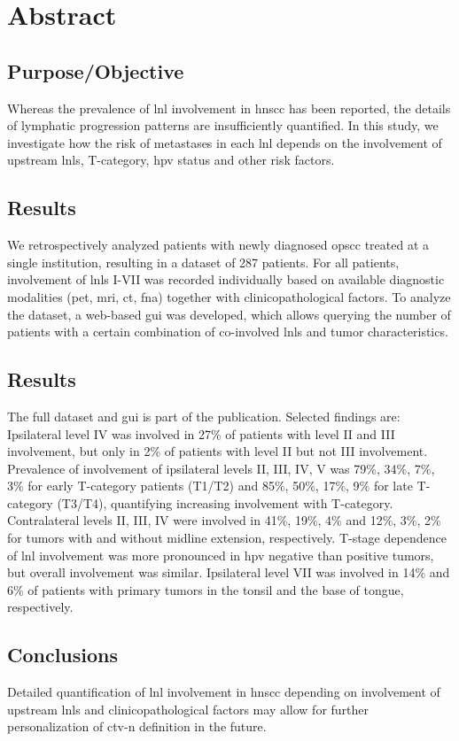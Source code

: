 \documentclass[\relativeRoot/main.tex]{subfiles}
\begin{document}
\section{Abstract}
\label{sec:dataset:asbtract}

\subsection*{Purpose/Objective}

Whereas the prevalence of \gls{lnl} involvement in \gls{hnscc} has been reported, the details of lymphatic progression patterns are insufficiently quantified. In this study, we investigate how the risk of metastases in each \gls{lnl} depends on the involvement of upstream \glspl{lnl}, T-category, \gls{hpv} status and other risk factors.

\subsection*{Results}

We retrospectively analyzed patients with newly diagnosed \gls{opscc} treated at a single institution, resulting in a dataset of 287 patients. For all patients, involvement of \glspl{lnl} I-VII was recorded individually based on available diagnostic modalities (\gls{pet}, \gls{mri}, \gls{ct}, \gls{fna}) together with clinicopathological factors. To analyze the dataset, a web-based \gls{gui} was developed, which allows querying the number of patients with a certain combination of co-involved \glspl{lnl} and tumor characteristics.

\subsection*{Results}

The full dataset and \gls{gui} is part of the publication. Selected findings are: Ipsilateral level IV was involved in 27\% of patients with level II and III involvement, but only in 2\% of patients with level II but not III involvement. Prevalence of involvement of ipsilateral levels II, III, IV, V was 79\%, 34\%, 7\%, 3\% for early T-category patients (T1/T2) and 85\%, 50\%, 17\%, 9\% for late T-category (T3/T4), quantifying increasing involvement with T-category. Contralateral levels II, III, IV were involved in 41\%, 19\%, 4\% and 12\%, 3\%, 2\% for tumors with and without midline extension, respectively. T-stage dependence of \gls{lnl} involvement was more pronounced in \gls{hpv} negative than positive tumors, but overall involvement was similar. Ipsilateral level VII was involved in 14\% and 6\% of patients with primary tumors in the tonsil and the base of tongue, respectively.

\subsection*{Conclusions}

Detailed quantification of \gls{lnl} involvement in \gls{hnscc} depending on involvement of upstream \glspl{lnl} and clinicopathological factors may allow for further personalization of \gls{ctv-n} definition in the future.
\end{document}
